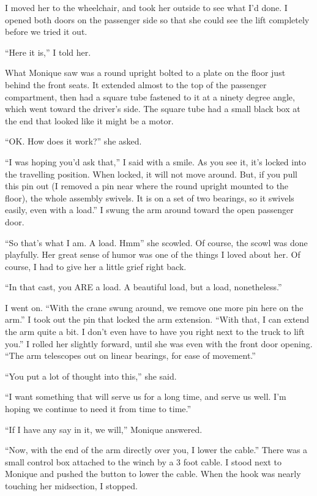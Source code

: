 I moved her to the wheelchair, and took her outside to see what I'd done. I opened both
doors on the passenger side so that she could see the lift completely before we tried it out.

``Here it is,'' I told her.

What Monique saw was a round upright bolted to a plate on the floor just behind the front
seats. It extended almost to the top of the passenger compartment, then had a square tube
fastened to it at a ninety degree angle, which went toward the driver's side. The square tube
had a small black box at the end that looked like it might be a motor.

``OK. How does it work?'' she asked.

``I was hoping you'd ask that,'' I said with a smile. As you see it, it's locked into the
travelling position. When locked, it will not move around. But, if you pull this pin out (I
removed a pin near where the round upright mounted to the floor), the whole assembly swivels. It
is on a set of two bearings, so it swivels easily, even with a load.'' I swung the arm around
toward the open passenger door.

``So that's what I am. A load. Hmm'' she scowled. Of course, the scowl was done playfully.
Her great sense of humor was one of the things I loved about her. Of course, I had to give her a
little grief right back.

``In that cast, you ARE a load. A beautiful load, but a load, nonetheless.''

I went on. ``With the crane swung around, we remove one more pin here on the arm.'' I took
out the pin that locked the arm extension. ``With that, I can extend the arm quite a bit. I
don't
even have to have you right next to the truck to lift you.'' I rolled her slightly forward,
until
she was even with the front door opening. ``The arm telescopes out on linear bearings, for ease
of movement.''

``You put a lot of thought into this,'' she said.

``I want something that will serve us for a long time, and serve us well. I'm hoping we
continue to need it from time to time.''

``If I have any say in it, we will,'' Monique answered.

``Now, with the end of the arm directly over you, I lower the cable.'' There was a small
control box attached to the winch by a 3 foot cable. I stood next to Monique and pushed the
button to lower the cable. When the hook was nearly touching her midsection, I stopped.

